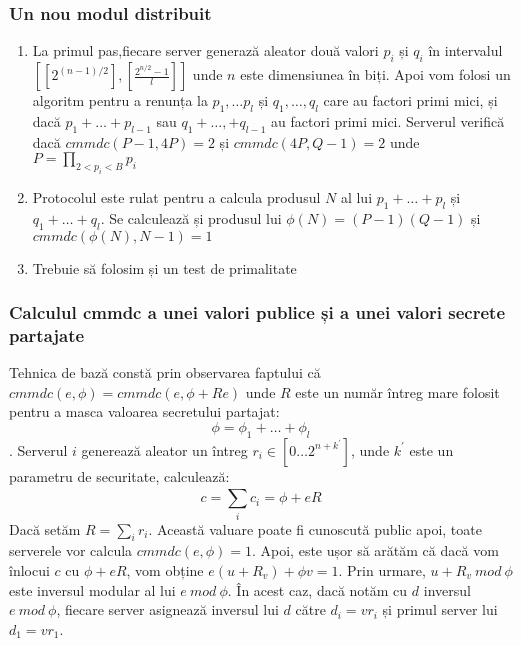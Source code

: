 \documentclass[12]{report}
\begin{document}
\subsubsection{Un nou modul distribuit}
\begin{enumerate}

\item La primul pas,fiecare server generază aleator două valori $p_i$ și $q_i$ în intervalul $ \left[ [2^{(n-1)/2}], [\frac{2^{n/2}-1}{l}] \right]$ unde $n$ este dimensiunea în biți. Apoi vom folosi un algoritm pentru a renunța la $p_1, \dots p_l$ și $q_1, \dots ,q_l$ care au factori primi mici, și dacă $p_1+ \dots +p_{l-1}$ sau $q_1+ \dots ,+q_{l-1}$ au factori primi mici. Serverul verifică dacă $cmmdc(P-1,4P)=2$ și $cmmdc(4P,Q-1)=2$ unde $P = \prod_{2 <p_i < B} p_i$

\item Protocolul este rulat pentru a calcula produsul $N$ al lui $p_1+ \dots +p_l$ și $q_1+ \dots +q_l$. Se calculează și produsul lui $\phi(N)=(P-1)(Q-1)$ și $cmmdc(\phi(N),N-1)=1$

\item Trebuie să folosim și un test de primalitate
\end{enumerate}
\subsubsection{Calculul cmmdc a unei valori publice și a unei valori secrete partajate}
Tehnica de bază constă prin observarea faptului că $cmmdc(e,\phi)=cmmdc(e,\phi + Re)$ unde $R$ este un număr întreg mare folosit pentru a masca valoarea secretului partajat:
$$\phi=\phi_1+ \dots +\phi _l$$.
Serverul $i$ generează aleator un întreg $r_i \in [0  \dots  2^{n+k^{'}}]$, unde $k^{'}$ este un parametru de securitate, calculează:
$$ c = \sum_{i}^{} c_i = \phi + eR$$
Dacă setăm $R=\sum_i r_i$. Această valuare poate fi cunoscută public apoi, toate serverele vor calcula $cmmdc(e,\phi)=1$. Apoi, este ușor să arătăm că dacă vom înlocui $c$ cu $\phi + eR$, vom obține $e(u + R_v) + \phi v = 1$. Prin urmare, $u + R_v \ mod \ \phi$ este inversul modular al lui $e \ mod \ \phi$. În acest caz, dacă notăm cu $d$ inversul $e \ mod \ \phi$, fiecare server asignează inversul lui $d$ către $d_i = vr_i$ și primul server lui $d_1= vr_1$.
\end{document}
